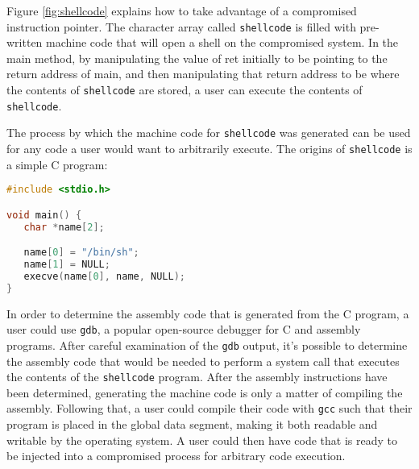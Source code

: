 Figure \ref{fig:shellcode} explains how to take advantage of a compromised instruction pointer. The character array called \texttt{shellcode} is filled with pre-written machine code that will open a shell on the compromised system. In the main method, by manipulating the value of ret initially to be pointing to the return address of main, and then manipulating that return address to be where the contents of \texttt{shellcode} are stored, a user can execute the contents of \texttt{shellcode}.

The process by which the machine code for \texttt{shellcode} was generated can be used for any code a user would want to arbitrarily execute. The origins of \texttt{shellcode} is a simple C program:

\begin{lstlisting}[language=C]
#include <stdio.h>

void main() {
   char *name[2];

   name[0] = "/bin/sh";
   name[1] = NULL;
   execve(name[0], name, NULL);
}
\end{lstlisting}

In order to determine the assembly code that is generated from the C program, a user could use \texttt{gdb}, a popular open-source debugger for C and assembly programs. After careful examination of the \texttt{gdb} output, it's possible to determine the assembly code that would be needed to perform a system call that executes the contents of the \texttt{shellcode} program. After the assembly instructions have been determined, generating the machine code is only a matter of compiling the assembly. Following that, a user could compile their code with \texttt{gcc} such that their program is placed in the global data segment, making it both readable and writable by the operating system. A user could then have code that is ready to be injected into a compromised process for arbitrary code execution. \cite{smash}
